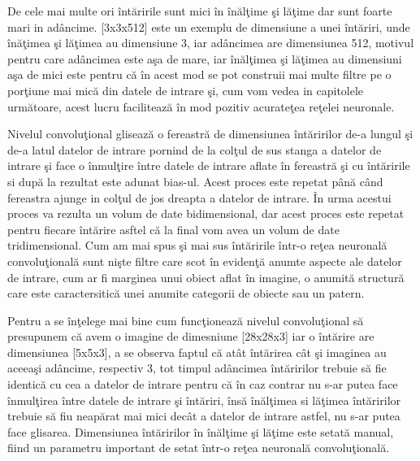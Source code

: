 \par

De cele mai multe ori \^{i}nt\u{a}ririle sunt mici \^{i}n \^{i}n\u{a}l\c{t}ime \c{s}i l\u{a}\c{t}ime dar sunt foarte mari in ad\^{a}ncime. [3x3x512] este un exemplu de dimensiune a unei \^{i}nt\u{a}riri, unde \^{i}n\u{a}\c{t}imea \c{s}i l\u{a}\c{t}imea au dimensiune 3, iar ad\^{a}ncimea are dimensiunea 512, motivul pentru care ad\^{a}ncimea este a\c{s}a de mare, iar \^{i}n\u{a}l\c{t}imea \c{s}i l\u{a}\c{t}imea au dimensiuni a\c{s}a de mici  este pentru c\u{a} \^{i}n acest mod se pot construii mai multe filtre pe o por\c{t}iune mai mic\u{a} din datele de intrare \c{s}i, cum vom vedea in capitolele urm\u{a}toare, acest lucru faciliteaz\u{a} \^{i}n mod pozitiv acurate\c{t}ea re\c{t}elei neuronale.

\par

Nivelul convolu\c{t}ional gliseaz\u{a} o fereastr\u{a} de dimensiunea \^{i}nt\u{a}ririlor de-a lungul \c{s}i de-a latul datelor de intrare pornind de la col\c{t}ul de sus stanga a datelor de intrare \c{s}i face o \^{i}nmul\c{t}ire \^{i}ntre  datele de intrare aflate \^{i}n fereastr\u{a} \c{s}i cu \^{i}nt\u{a}ririle si  dup\u{a} la rezultat este adunat bias-ul. Acest proces este repetat p\^{a}n\u{a} c\^{a}nd fereastra ajunge in col\c{t}ul de jos dreapta a datelor de intrare. \^{I}n urma acestui proces va rezulta un volum de date bidimensional, dar acest proces este repetat pentru fiecare \^{i}nt\u{a}rire asftel c\u{a} la final vom avea un volum de date tridimensional. Cum am mai spus \c{s}i mai sus \^{i}nt\u{a}ririle \^{i}ntr-o re\c{t}ea neuronal\u{a} convolu\c{t}ional\u{a} sunt ni\c{s}te filtre care scot \^{i}n eviden\c{t}\u{a} anumte aspecte ale datelor de intrare, cum ar fi marginea unui obiect aflat \^{i}n imagine, o anumit\u{a} structur\u{a} care este caractersitic\u{a} unei anumite categorii de obiecte sau un patern.

\par

Pentru a se \^{i}n\c{t}elege mai bine cum func\c{t}ioneaz\u{a} nivelul convolu\c{t}ional s\u{a} presupunem c\u{a} avem o imagine de dimesniune [28x28x3] iar o \^{i}nt\u{a}rire are dimensiunea [5x5x3], a se observa faptul c\u{a} at\^{a}t  \^{i}nt\u{a}rirea c\^{a}t \c{s}i imaginea au aceea\c{s}i ad\^{a}ncime, respectiv 3, tot timpul ad\^{a}ncimea \^{i}nt\u{a}ririlor trebuie s\u{a} fie identic\u{a} cu cea a datelor de intrare pentru c\u{a} \^{i}n caz contrar nu s-ar putea face \^{i}nmul\c{t}irea \^{i}ntre datele de intrare \c{s}i \^{i}nt\u{a}riri, \^{i}ns\u{a} \^{i}n\u{a}l\c{t}imea si l\u{a}\c{t}imea \^{i}nt\u{a}ririlor trebuie s\u{a} fiu neap\u{a}rat mai mici dec\^{a}t a datelor de intrare astfel, nu s-ar putea face glisarea. Dimensiunea \^{i}nt\u{a}ririlor \^{i}n \^{i}n\u{a}l\c{t}ime \c{s}i l\u{a}\c{t}ime este setat\u{a} manual, fiind un parametru important de setat \^{i}ntr-o re\c{t}ea neuronal\u{a} convolu\c{t}ional\u{a}. 

